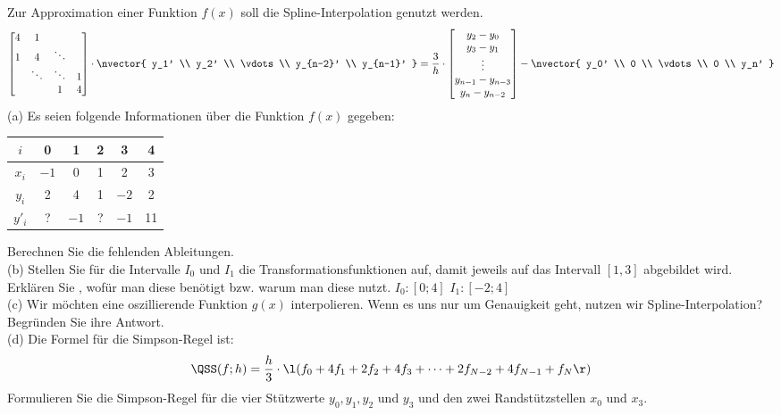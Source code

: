 \documentclass{scrartcl}
\begin{document}
	Zur Approximation einer Funktion $f(x)$ soll die Spline-Interpolation genutzt werden.
	\begin{align}
		\begin{bmatrix}
			4 & 1 \\
			1 & 4 & \ddots\\
			& \ddots & \ddots & 1\\
			&   & 1 & 4
		\end{bmatrix} \cdot
		\nvector{
			y_1' \\ y_2' \\ \vdots \\ y_{n-2}' \\ y_{n-1}'
		}
		= \frac{3}{h} \cdot
		\begin{bmatrix}
			y_2 - y_0 \\
			y_3 - y_1 \\
			\vdots \\
			y_{n-1} - y_{n-3} \\
			y_n - y_{n-2}
		\end{bmatrix} - 
		\nvector{
			y_0' \\ 0 \\ \vdots \\ 0 \\ y_n'
		}
	\end{align}
	\n
	(a)
	Es seien folgende Informationen über die Funktion $f(x)$ gegeben:
	\begin{center}
		\begin{tabular}{cccccc}
			\toprule
			$i$ 	& 0 	& 1 	& 2 	& 3  	& 4 \\ \midrule
			$x_i$	& $-1$ 	& 0 	& 1 	& 2		& 3 \\
			$y_i$	& 2 	& 4 	& 1    	& $-2$	& 2 \\
			$y'_i$  & ?    	& $-1$ 	& ?  	& $-1$ 	& 11 \\
			\bottomrule
		\end{tabular}
	\end{center}
	Berechnen Sie die fehlenden Ableitungen.
	\lbreak \lbreak \lbreak
	\\
	(b)
	Stellen Sie für die Intervalle $I_0$ und $I_1$ die Transformationsfunktionen auf, damit jeweils auf das Intervall $[1,3]$ abgebildet wird. Erklären Sie , wofür man diese benötigt bzw. warum man diese nutzt.
	\n 
	$I_0 : [0;4]$
	\n 
	$I_1 : [-2;4]$
	\lbreak \lbreak \lbreak
	\\
	(c)
	Wir möchten eine oszillierende Funktion $g(x)$ interpolieren. Wenn es uns nur um Genauigkeit geht, nutzen wir Spline-Interpolation? Begründen Sie ihre Antwort.
	\lbreak \lbreak
	\\
	(d)
	Die Formel für die Simpson-Regel ist:
	\begin{align*}
		\QSS(f;h) = \frac{h}{3}\cdot \l(f_0 + 4f_1 + 2f_2 + 4f_3 + \dots + 2f_{N-2} + 4f_{N-1} + f_N \r)
	\end{align*}
	Formulieren Sie die Simpson-Regel für die vier Stützwerte $y_0, y_1, y_2$ und $y_3$ und den zwei Randstützstellen $x_0$ und $x_3$.
\end{document}
